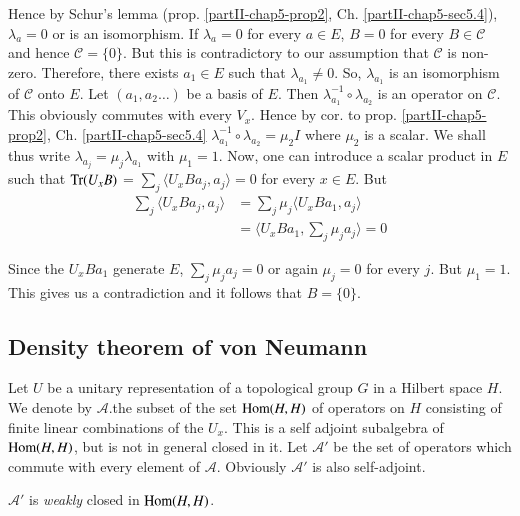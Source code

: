 Hence by Schur's lemma  (prop. \ref{partII-chap5-prop2},
Ch. \ref{partII-chap5-sec5.4}), $\lambda_{a} =0$ or 
is an isomorphism. If $\lambda_{a}=0$ for every $a \in E$, $B=0$ for
every $B \in \mathscr{C}$ and  hence $\mathscr{C} = \{0\}$. But this
is contradictory to our assumption that $\mathscr{C}$ is
non-zero. Therefore, there exists $a_{1} \in E $ such that $\lambda
_{a_1}  \neq 0$. So, $\lambda _{a_1}$ is an isomorphism of
$\mathscr{C}$ onto $E$. Let $(a_{1},a_{2}\ldots)$ be a basis  of
$E$. Then $\lambda^{-1}_{a_1}  \circ \lambda_{a_2}$ is an operator on
$\mathscr{C}$. This obviously commutes with  every $V_{x}$. Hence  by
cor. to prop. \ref{partII-chap5-prop2}, Ch. \ref{partII-chap5-sec5.4}
$\lambda^{-1}_{a_1}\circ \lambda_{a_2}= 
\mu_{2} I$ where $\mu_2$ is a scalar. We shall thus write
$\lambda_{a_j} = \mu_{j} \lambda_{a_1}$ with $\mu_{1} =1$. Now,  one
can introduce  a scalar  product in $E$ such that $\operatorname{Tr}(U_{x}B)$ =
$\sum\limits_{j} \langle U_{x}Ba_{j},a_{j}\rangle=0$ for every $x \in
E$. But 
\begin{align*}  
\sum\limits_{j}\langle U_{x} Ba_{j}, a_{j} \rangle & = \sum\limits_{j} \mu_{j} \langle U_{x}Ba_{1}, a_{j}\rangle \\ 
  & = \langle U_{x}Ba_{1}, \sum\limits_{j} \mu_{j} a_{j} \rangle  =  0 
 \end{align*} 

Since the $ U_{x}Ba_{1}$ generate $E$, $\sum\limits_{j} \mu_{j} a_{j}
= 0$ or again $\mu_{j} = 0 $ for every $j$. 
But\pageoriginale 
$\mu_1 = 1$. This gives us a contradiction and it follows that $B=
\{0\}$. 

\subsection{Density theorem of von
  Neumann}\label{partII-chap5-sec5.6}%

Let $U$ be a unitary representation of a topological group $G$ in a
Hilbert space $H$. We denote by $\mathcal{A}$.the subset of the set
$\operatorname{Hom}(H,H)$ of operators on $H$ consisting of finite linear
combinations of the $U_x$. This is a self adjoint subalgebra of
$\operatorname{Hom}(H,H)$, but is not in general closed in it. Let $\mathcal{A}'$ be
the 
set of operators which commute with every element of
$\mathcal{A}$. Obviously $\mathcal{A}'$ is also self-adjoint. 

\begin{proposition}\label{partII-chap5-prop4}%
 $\mathcal{A}'$ is {\em weakly} closed in $\operatorname{Hom}(H,H)$.
\end{proposition}

